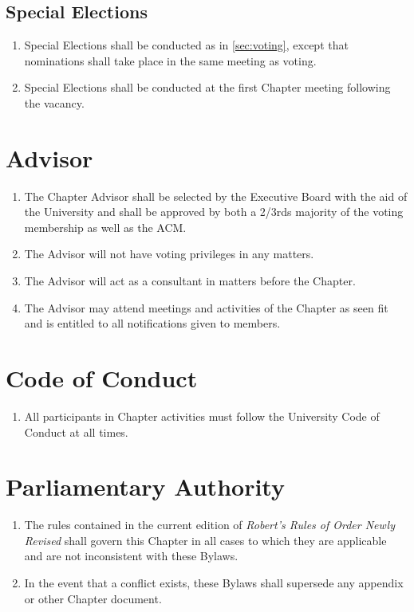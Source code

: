 \documentclass[12pt, letterpaper, oneside]{book}
\begin{document}
\section{Special Elections} \label{sec:specialelections}
\begin{enumerate}
    \item Special Elections shall be conducted as in \cref{sec:voting}, except
        that nominations shall take place in the same meeting as voting.
    \item Special Elections shall be conducted at the first Chapter meeting
        following the vacancy.
\end{enumerate}

\chapter{Advisor}
\begin{enumerate}
    \item The Chapter Advisor shall be selected by the Executive Board with the
        aid of the University and shall be approved by both a 2/3rds majority of
        the voting membership as well as the ACM.
    \item The Advisor will not have voting privileges in any matters.
    \item The Advisor will act as a consultant in matters before the Chapter.
    \item The Advisor may attend meetings and activities of the Chapter as seen
        fit and is entitled to all notifications given to members.
\end{enumerate}

\chapter{Code of Conduct}
\begin{enumerate}
    \item All participants in Chapter activities must follow the University Code
        of Conduct at all times.
\end{enumerate}

\chapter{Parliamentary Authority}
\begin{enumerate}
    \item The rules contained in the current edition of \emph{Robert's Rules of
        Order Newly Revised} shall govern this Chapter in all cases to which
        they are applicable and are not inconsistent with these Bylaws.
    \item In the event that a conflict exists, these Bylaws shall supersede any
        appendix or other Chapter document.
\end{enumerate}
\end{document}
